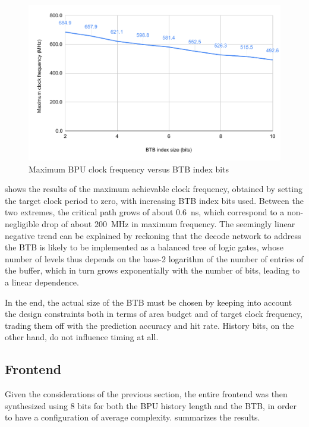 \begin{figure}[hbt]
  \centering
  \includegraphics[width=\textwidth]{img/bpu_freq.pdf}
  \caption{Maximum \acs{BPU} clock frequency versus \ac{BTB} index bits}
  \label{fig:bpu_freq}
\end{figure}
 shows the results of the maximum achievable clock frequency, obtained by setting the target clock period to zero, with increasing \ac{BTB} index bits used. Between the two extremes, the critical path grows of about \SI{0.6}{ns}, which correspond to a non-negligible drop of about \SI{200}{MHz} in maximum frequency. The seemingly linear negative trend can be explained by reckoning that the decode network to address the \ac{BTB} is likely to be implemented as a balanced tree of logic gates, whose number of levels thus depends on the base-2 logarithm of the number of entries of the buffer, which in turn grows exponentially with the number of bits, leading to a linear dependence.

In the end, the actual size of the \ac{BTB} must be chosen by keeping into account the design constraints both in terms of area budget and of target clock frequency, trading them off with the prediction accuracy and hit rate. History bits, on the other hand, do not influence timing at all.

\subsection{Frontend}
Given the considerations of the previous section, the entire frontend was then synthesized using 8 bits for both the \ac{BPU} history length and the \ac{BTB}, in order to have a configuration of average complexity.  summarizes the results.

